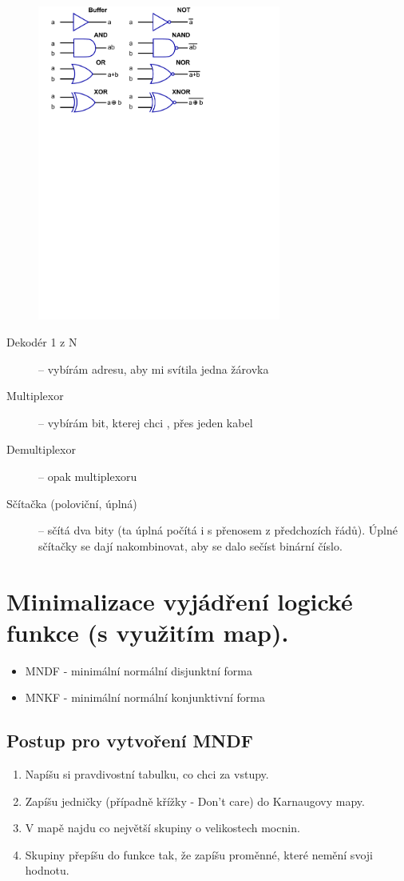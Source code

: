 \documentclass{szzclass}
\begin{document}
\begin{figure}[h]
\includegraphics[width=8cm]{gates}
\end{figure}

\begin{description}
  \item [Dekodér 1 z N] -- vybírám adresu, aby mi svítila jedna žárovka
  \item [Multiplexor] -- vybírám bit, kterej chci , přes jeden kabel
  \item [Demultiplexor] -- opak multiplexoru
  \item [Sčítačka (poloviční, úplná)] -- sčítá dva bity (ta úplná počítá i s přenosem z předchozích řádů). Úplné sčítačky se dají nakombinovat, aby se dalo sečíst binární číslo.
\end{description}

\section{Minimalizace vyjádření logické funkce (s využitím map).}
\begin{itemize}
  \item MNDF - minimální normální disjunktní forma
  \item MNKF - minimální normální konjunktivní forma
\end{itemize}

\subsection{Postup pro vytvoření MNDF}
\begin{enumerate}
  \item Napíšu si pravdivostní tabulku, co chci za vstupy.
  \item Zapíšu jedničky (případně křížky - Don't care) do Karnaugovy mapy.
  \item V mapě najdu co největší skupiny o velikostech mocnin.
  \item Skupiny přepíšu do funkce tak, že zapíšu proměnné, které nemění svoji hodnotu.
\end{enumerate}
\end{document}
